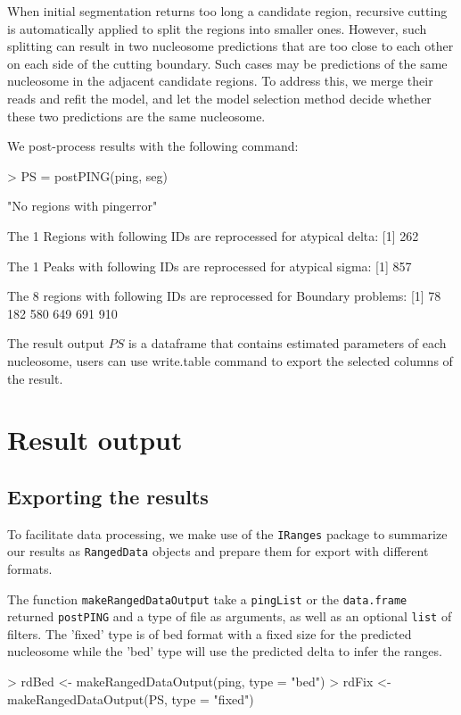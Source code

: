 \documentclass[11pt]{article}
\begin{document}
When initial segmentation returns too long a candidate region, recursive cutting is automatically applied to split the regions into smaller ones. However, such splitting can result in two nucleosome predictions that are too close to each other on each side of the cutting boundary. Such cases may be predictions of the same nucleosome in the adjacent candidate regions. To address this, we merge their reads and refit the model, and let the model selection method decide whether these two predictions are the same nucleosome.

We post-process results with the following command:


\begin{Schunk}
\begin{Sinput}
> PS = postPING(ping, seg)
\end{Sinput}
\begin{Soutput}
[1] "No regions with pingerror"

 The 1 Regions with following IDs are reprocessed for atypical delta: 
[1] 262

 The 1 Peaks with following IDs are reprocessed for atypical sigma: 
[1] 857

 The 8 regions with following IDs are reprocessed for Boundary problems: 
[1]  78 182 580 649 691 910
\end{Soutput}
\end{Schunk}
The result output $PS$ is a dataframe that contains estimated parameters of each
nucleosome, users can use write.table command to export the selected columns of
the result.

\section{Result output}

\subsection{Exporting the results}
To facilitate data processing, we make use of the \texttt{IRanges} package to
summarize our results as \texttt{RangedData} objects and prepare them for
export with different formats.


The function \texttt{makeRangedDataOutput} take a \texttt{pingList} or the
\texttt{data.frame} returned \texttt{postPING} and a type of file as arguments,
as well as an optional \texttt{list} of filters.
The 'fixed' type is of bed format with a fixed size for the predicted nucleosome
while the 'bed' type will use the predicted delta to infer the ranges.
\begin{Schunk}
\begin{Sinput}
> rdBed <- makeRangedDataOutput(ping, type = "bed")
> rdFix <- makeRangedDataOutput(PS, type = "fixed")
\end{Sinput}
\end{Schunk}
\end{document}
